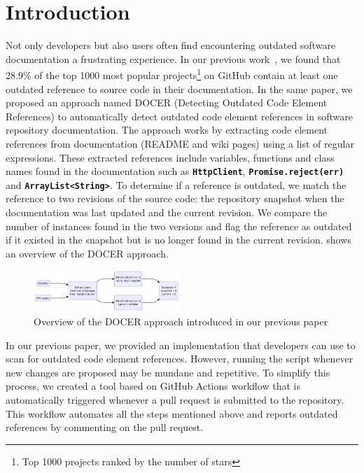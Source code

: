 \documentclass[conference]{IEEEtran}
\newcommand{\codeword}[1]{\texttt{\textbf{\footnotesize#1}}}
\begin{document}
\section{Introduction}
Not only developers but also users often find encountering outdated software documentation a frustrating experience. In our previous work~\cite{tan2022detecting}, we found that 28.9\% of the top 1000 most popular projects\footnote{Top 1000 projects ranked by the number of stars} on GitHub contain at least one outdated reference to source code in their documentation. In the same paper, we proposed an approach named DOCER (Detecting Outdated Code Element References) to automatically detect outdated code element references in software repository documentation. The approach works by extracting code element references from documentation (README and wiki pages) using a list of regular expressions. These extracted references include variables, functions and class names found in the documentation such as \codeword{HttpClient}, \codeword{Promise.reject(err)} and \codeword{ArrayList<String>}. To determine if a reference is outdated, we match the reference to two revisions of the source code: the repository snapshot when the documentation was last updated and the current revision. We compare the number of instances found in the two versions and flag the reference as outdated if it existed in the snapshot but is no longer found in the current revision.  shows an overview of the DOCER approach.

\begin{figure}[htbp]
    \centering
    \includegraphics[width=0.49\textwidth]{docer_overview.png}
    \caption{Overview of the DOCER approach introduced in our previous paper}
    \label{fig:docer_overview}
\end{figure}

In our previous paper, we provided an implementation that developers can use to scan for outdated code element references. However, running the script whenever new changes are proposed may be mundane and repetitive. To simplify this process, we created a tool based on GitHub Actions workflow that is automatically triggered whenever a pull request is submitted to the repository. This workflow automates all the steps mentioned above and reports outdated references by commenting on the pull request. 
\end{document}
